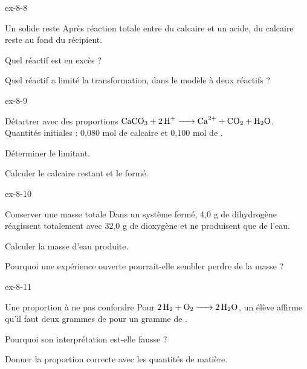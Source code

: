 \begin{blocLivre}{ex-8-8}\begin{exercice}[2]{Un solide reste}
Après réaction totale entre du calcaire et un acide, du calcaire reste au fond du récipient.
\begin{questions}
\item Quel réactif est en excès ?
\item Quel réactif a limité la transformation, dans le modèle à deux réactifs ?
\end{questions}
\end{exercice}\end{blocLivre}
\clearpage
{}
\begin{blocLivre}{ex-8-9}\begin{exercice}[3]{Détartrer avec des proportions}
$\ce{CaCO3 + 2 H+ -> Ca^{2+} + CO2 + H2O}$. Quantités initiales : 0,080 mol de calcaire et 0,100 mol de .
\begin{questions}
\item Déterminer le limitant.
\item Calculer le calcaire restant et le  formé.
\end{questions}
\end{exercice}\end{blocLivre}
\begin{blocLivre}{ex-8-10}\begin{exercice}[3]{Conserver une masse totale}
Dans un système fermé, 4,0 g de dihydrogène réagissent totalement avec 32,0 g de dioxygène et ne produisent que de l’eau.
\begin{questions}
\item Calculer la masse d’eau produite.
\item Pourquoi une expérience ouverte pourrait-elle sembler perdre de la masse ?
\end{questions}
\end{exercice}\end{blocLivre}
\begin{blocLivre}{ex-8-11}\begin{exercice}[3]{Une proportion à ne pas confondre}
Pour $\ce{2 H2 + O2 -> 2 H2O}$, un élève affirme qu’il faut deux grammes de  pour un gramme de .
\begin{questions}
\item Pourquoi son interprétation est-elle fausse ?
\item Donner la proportion correcte avec les quantités de matière.
\end{questions}
\end{exercice}\end{blocLivre}
